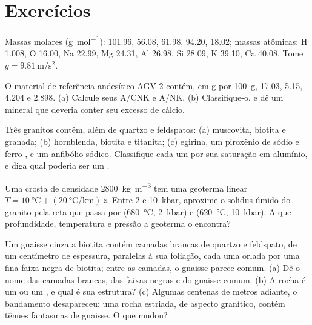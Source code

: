 \section{Exercícios}\label{sec:b2:crustal-melting:exercises}

Massas molares (\unit{\gram\per\mole}):  101.96,  56.08,  61.98,
 94.20,  18.02; massas atômicas: H 1.008, O 16.00, Na 22.99, Mg 24.31,
Al 26.98, Si 28.09, K 39.10, Ca 40.08. Tome $g = \qty{9.81}{\metre\per\second\squared}$.

\begin{exercise}[$\star$]\label{exo:b2:crustal-melting:1}
O material de referência andesítico AGV-2 contém, em \unit{\gram} por \qty{100}{\gram},
 17.03,  5.15,  4.204 e  2.898.
(a) Calcule seus A/CNK e A/NK. (b) Classifique-o, e dê um mineral que deveria conter seu
excesso de cálcio.
\end{exercise}

\begin{exercise}[$\star$]\label{exo:b2:crustal-melting:2}
Três granitos contêm, além de quartzo e feldspatos: (a) muscovita, biotita e granada;
(b) hornblenda, biotita e titanita; (c) egirina, um piroxênio de sódio e ferro
, e um anfibólio sódico. Classifique cada um por sua saturação em alumínio, e diga
qual poderia ser um .
\end{exercise}

\begin{exercise}[$\star$]\label{exo:b2:crustal-melting:3}
Uma crosta de densidade \qty{2800}{\kilogram\per\cubic\metre} tem uma geoterma linear
$T = \qty{10}{\celsius} + (\qty{20}{\celsius\per\kilo\metre})\,z$. Entre 2 e
\qty{10}{kbar}, aproxime o solidus úmido do granito pela reta que passa por
(\qty{680}{\celsius}, \qty{2}{kbar}) e (\qty{620}{\celsius}, \qty{10}{kbar}). A que
profundidade, temperatura e pressão a geoterma o encontra?
\end{exercise}

\begin{exercise}[$\star$]\label{exo:b2:crustal-melting:4}
Um gnaisse cinza a biotita contém camadas brancas de quartzo e feldspato, de um centímetro de espessura, paralelas
à sua foliação, cada uma orlada por uma fina faixa negra de biotita; entre as camadas, o
gnaisse parece comum. (a) Dê o nome das camadas brancas, das faixas negras e do gnaisse comum.
(b) A rocha é um  ou um , e qual é sua estrutura? (c) Algumas centenas de
metros adiante, o bandamento desapareceu: uma rocha estriada, de aspecto granítico, contém tênues fantasmas de
gnaisse. O que mudou?
\end{exercise}

